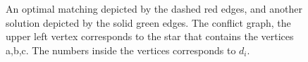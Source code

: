 \begin{figure}[h]
\centering
\subfloat[]{
\label{subfloat:graph}

}
\subfloat[]{
\label{subfloat:conflict}

}
\caption[]{
\label{fig:conflict}
An optimal matching depicted by the dashed red edges,
and another solution depicted by the solid green edges.  
The conflict graph, the upper left vertex corresponds 
to the star that contains the vertices a,b,c.
The numbers inside the vertices corresponds to $d_i$.   
}
\end{figure}  
